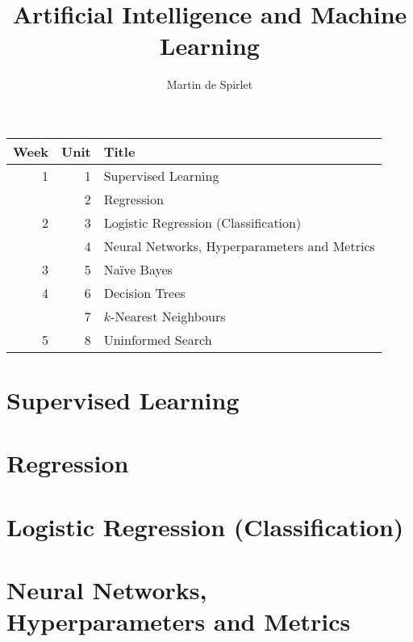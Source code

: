 \documentclass[
  11pt,
  a4paper,
]{article}
\title{Artificial Intelligence and Machine Learning}
\author{Martin de Spirlet}
\date{}
\begin{document}

\maketitle

\vspace*{\fill}

\begin{table}[htp]
  \centering
  \begin{tabular}{rrl}
    \toprule
    Week & Unit & Title \\
    \midrule
    1 & 1 & Supervised Learning \\
      & 2 & Regression \\ [1ex]
    2 & 3 & Logistic Regression (Classification) \\
      & 4 & Neural Networks, Hyperparameters and Metrics \\ [1ex]
    3 & 5 & Na\"{i}ve Bayes \\ [1ex]
    4 & 6 & Decision Trees \\
      & 7 & \( k \)-Nearest Neighbours \\ [1ex]
    5 & 8 & Uninformed Search \\
    \bottomrule
  \end{tabular}
\end{table}

\vspace*{\fill}
\addvspace{1in}

\clearpage


\section{Supervised Learning}


\section{Regression}


\section{Logistic Regression (Classification)}


\section{Neural Networks, Hyperparameters and Metrics}

\end{document}
